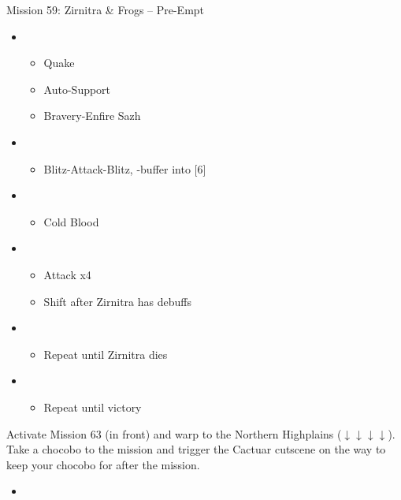 \begin{battle}{Mission 59: Zirnitra \& Frogs -- Pre-Empt}
	\begin{itemize}
		\item \fourth
			\begin{itemize}
				\item Quake
				\item Auto-Support
				\item Bravery-Enfire Sazh
			\end{itemize}
		\item \third
			\begin{itemize}
				\item Blitz-Attack-Blitz, \rav-buffer into [6]
			\end{itemize}
		\item \sixth
			\begin{itemize}
				\item Cold Blood
			\end{itemize}
		\item \second
			\begin{itemize}
				\item Attack x4
				\item Shift after Zirnitra has debuffs
			\end{itemize}
		\item \third
			\begin{itemize}
				\item Repeat until Zirnitra dies
			\end{itemize}
		\item \first
			\begin{itemize}
				\item Repeat until victory
			\end{itemize}
	\end{itemize}
\end{battle}

Activate Mission 63 (in front) and warp to the Northern Highplains ($\downarrow\downarrow\downarrow\downarrow$).
Take a chocobo to the mission and trigger the Cactuar cutscene on the way to keep your chocobo for after the mission.

\begin{menu}
	\begin{itemize}
	\paradigm
		\begin{itemize}
			\item {}%
				{\paradigmline{\com}{\com}{\com}}%
				{\paradigmline{\com}{\com}{\sab}}%
				{\paradigmline{\com}{(\rav)}{(\sab)}}%
				{\paradigmline{(\com)}{(\rav)}{(\rav)}}%
				{\paradigmline[4]{\syn}{\rav}{\sab}}%
				{\paradigmline{\rav}{\rav}{\sab}}%
		\end{itemize}
	\end{itemize}
\end{menu}

